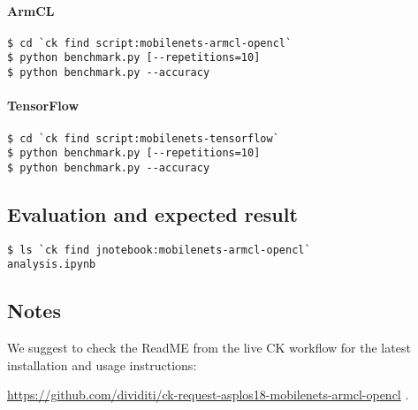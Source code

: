 \paragraph{ArmCL}

\begin{verbatim}
$ cd `ck find script:mobilenets-armcl-opencl`
$ python benchmark.py [--repetitions=10]
$ python benchmark.py --accuracy
\end{verbatim}

\paragraph{TensorFlow}

\begin{verbatim}
$ cd `ck find script:mobilenets-tensorflow`
$ python benchmark.py [--repetitions=10]
$ python benchmark.py --accuracy
\end{verbatim}


\subsection{Evaluation and expected result}

\begin{verbatim}
$ ls `ck find jnotebook:mobilenets-armcl-opencl`
analysis.ipynb
\end{verbatim}

\subsection{Notes}

We suggest to check the ReadME from the live CK workflow 
for the latest installation and usage instructions: 

\url{https://github.com/dividiti/ck-request-asplos18-mobilenets-armcl-opencl} .
